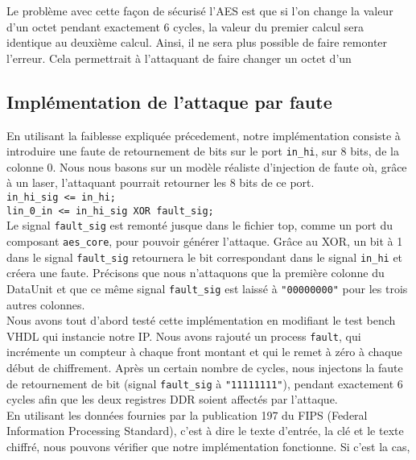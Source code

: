 Le problème avec cette façon de sécurisé l'AES est que si l'on change la valeur
d'un octet pendant exactement 6 cycles, la valeur du premier calcul sera
identique au deuxième calcul.
Ainsi, il ne sera plus possible de faire remonter l'erreur. Cela permettrait à
l'attaquant de faire changer un octet d'un


\subsection{Implémentation de l'attaque par faute}

En utilisant la faiblesse expliquée précedement, notre implémentation
consiste à introduire une faute de retournement de bits sur le port
\texttt{in\_hi}, sur 8 bits, de la colonne 0.
Nous nous basons sur un
modèle réaliste d'injection de faute où, grâce à un laser, l'attaquant
pourrait retourner les 8 bits de ce port.\\
\texttt{in\_hi\_sig <= in\_hi;\\  lin\_0\_in <= in\_hi\_sig XOR fault\_sig;} \\
Le signal \texttt{fault\_sig} est remonté jusque dans le fichier top, comme un
port du composant \texttt{aes\_core}, pour pouvoir générer l'attaque.
Grâce au XOR,
un bit à 1 dans le signal \texttt{fault\_sig} retournera le bit correspondant
dans le signal \texttt{in\_hi} et créera une faute.
Précisons que nous n'attaquons que la première colonne du DataUnit et que ce
même signal \texttt{fault\_sig} est laissé à \texttt{"00000000"} pour les trois
autres colonnes. \\
Nous avons tout d'abord testé cette implémentation en modifiant le test bench
VHDL qui instancie notre IP. Nous avons rajouté un process \texttt{fault},
qui incrémente un compteur à chaque front montant et qui le remet à zéro à
chaque début de chiffrement. Après un certain nombre de cycles, nous injectons
la faute de retournement de bit (signal \texttt{fault\_sig} à
\texttt{"11111111"}),
pendant exactement 6 cycles afin que les deux registres DDR soient affectés par
l'attaque. \\
En utilisant les données fournies par la publication 197 du FIPS (Federal
Information
Processing Standard), c'est à dire le texte d'entrée, la clé et le texte
chiffré,
nous pouvons vérifier que notre implémentation fonctionne. Si c'est la cas,
